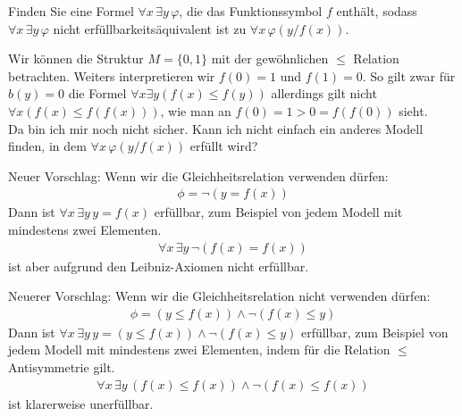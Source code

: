 
\begin{exercise}[176]
Finden Sie eine Formel $\forall x\, \exists y\, \varphi$, die das Funktionssymbol $f$
enthält, sodass $\forall x\, \exists y\, \varphi$ nicht erfüllbarkeitsäquivalent ist zu
$\forall x\, \varphi(y/f(x))$.
\end{exercise}


\begin{solution}
	Wir können die Struktur $M = \{0, 1\}$ mit der gewöhnlichen $\leq$ Relation betrachten.
  Weiters interpretieren wir $f(0) = 1$ und $f(1) = 0$.
  So gilt zwar für $b(y) = 0$ die Formel $\forall x \exists y (f(x) \leq f(y))$
  allerdings gilt nicht $\forall x (f(x) \leq f(f(x)))$,
  wie man an $f(0) = 1 > 0 = f(f(0))$ sieht. \\


  Da bin ich mir noch nicht sicher. Kann ich nicht einfach ein anderes Modell
  finden, in dem $\forall x\, \varphi(y/f(x))$ erfüllt wird?
\end{solution}



\begin{solution}
	Neuer Vorschlag: Wenn wir die Gleichheitsrelation verwenden dürfen:
	\begin{align*}
		\phi = \neg(y = f(x))
	\end{align*}
	Dann ist $\forall x\, \exists y\, y = f(x)$ erfüllbar, zum Beispiel von jedem
	Modell mit mindestens zwei Elementen.
	\begin{align*}
		\forall x\, \exists y\, \neg(f(x) = f(x))
	\end{align*}
	ist aber aufgrund den Leibniz-Axiomen nicht erfüllbar.
\end{solution}



\begin{solution}
	Neuerer Vorschlag: Wenn wir die Gleichheitsrelation nicht verwenden dürfen:
	\begin{align*}
		\phi = (y \leq f(x)) \land \neg(f(x) \leq y)
	\end{align*}
	Dann ist $\forall x\, \exists y\, y = (y \leq f(x)) \land \neg(f(x) \leq y)$ erfüllbar,
	zum Beispiel von jedem Modell mit mindestens zwei Elementen, indem für die
	Relation $\leq$ Antisymmetrie gilt.
	\begin{align*}
		\forall x\, \exists y\, (f(x) \leq f(x)) \land \neg(f(x) \leq f(x))
	\end{align*}
	ist klarerweise unerfüllbar.
\end{solution}

